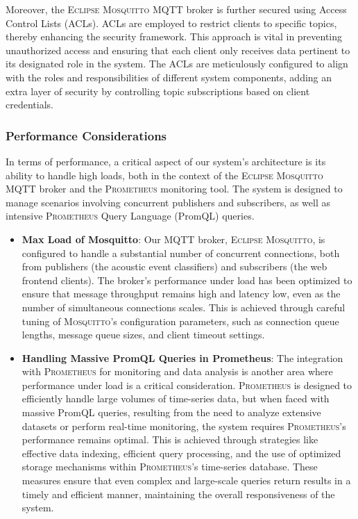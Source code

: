 Moreover, the \textsc{Eclipse Mosquitto} MQTT broker is further secured using Access Control Lists (ACLs)\cite{mosquittoMosquittoconfPage}. ACLs are employed to restrict clients to specific topics, thereby enhancing the security framework. This approach is vital in preventing unauthorized access and ensuring that each client only receives data pertinent to its designated role in the system. The ACLs are meticulously configured to align with the roles and responsibilities of different system components, adding an extra layer of security by controlling topic subscriptions based on client credentials.

\subsubsection{Performance Considerations}
In terms of performance, a critical aspect of our system's architecture is its ability to handle high loads, both in the context of the \textsc{Eclipse Mosquitto} MQTT broker and the \textsc{Prometheus} monitoring tool. The system is designed to manage scenarios involving concurrent publishers and subscribers, as well as intensive \textsc{Prometheus} Query Language (PromQL) queries.

\begin{itemize}
  \item \textbf{Max Load of Mosquitto}: Our MQTT broker, \textsc{Eclipse Mosquitto}, is configured to handle a substantial number of concurrent connections, both from publishers (the acoustic event classifiers) and subscribers (the web frontend clients). The broker's performance under load has been optimized to ensure that message throughput remains high and latency low, even as the number of simultaneous connections scales. This is achieved through careful tuning of \textsc{Mosquitto}'s configuration parameters, such as connection queue lengths, message queue sizes, and client timeout settings. %
  \item \textbf{Handling Massive PromQL Queries in Prometheus}: The integration with \textsc{Prometheus} for monitoring and data analysis is another area where performance under load is a critical consideration. \textsc{Prometheus} is designed to efficiently handle large volumes of time-series data, but when faced with massive PromQL queries, resulting from the need to analyze extensive datasets or perform real-time monitoring, the system requires \textsc{Prometheus}'s performance remains optimal. This is achieved through strategies like effective data indexing, efficient query processing, and the use of optimized storage mechanisms within \textsc{Prometheus}'s time-series database\cite{timescalePrometheusQuerying}. These measures ensure that even complex and large-scale queries return results in a timely and efficient manner, maintaining the overall responsiveness of the system.
\end{itemize}

